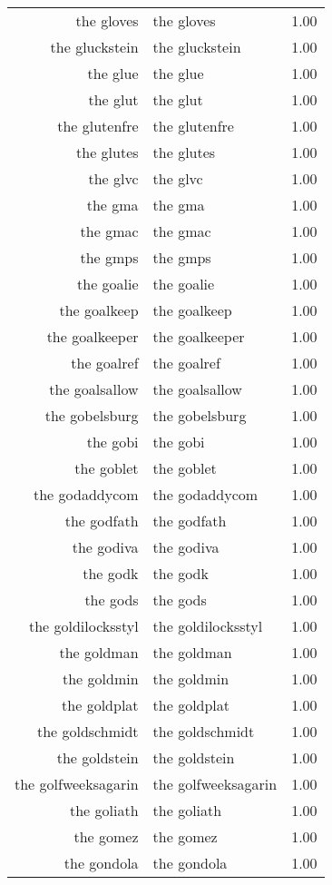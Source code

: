 \begin{table}[ht]
\begin{tabular}{rlr}
  the gloves & the gloves & 1.00 \\ 
  the gluckstein & the gluckstein & 1.00 \\ 
  the glue & the glue & 1.00 \\ 
  the glut & the glut & 1.00 \\ 
  the glutenfre & the glutenfre & 1.00 \\ 
  the glutes & the glutes & 1.00 \\ 
  the glvc & the glvc & 1.00 \\ 
  the gma & the gma & 1.00 \\ 
  the gmac & the gmac & 1.00 \\ 
  the gmps & the gmps & 1.00 \\ 
  the goalie & the goalie & 1.00 \\ 
  the goalkeep & the goalkeep & 1.00 \\ 
  the goalkeeper & the goalkeeper & 1.00 \\ 
  the goalref & the goalref & 1.00 \\ 
  the goalsallow & the goalsallow & 1.00 \\ 
  the gobelsburg & the gobelsburg & 1.00 \\ 
  the gobi & the gobi & 1.00 \\ 
  the goblet & the goblet & 1.00 \\ 
  the godaddycom & the godaddycom & 1.00 \\ 
  the godfath & the godfath & 1.00 \\ 
  the godiva & the godiva & 1.00 \\ 
  the godk & the godk & 1.00 \\ 
  the gods & the gods & 1.00 \\ 
  the goldilocksstyl & the goldilocksstyl & 1.00 \\ 
  the goldman & the goldman & 1.00 \\ 
  the goldmin & the goldmin & 1.00 \\ 
  the goldplat & the goldplat & 1.00 \\ 
  the goldschmidt & the goldschmidt & 1.00 \\ 
  the goldstein & the goldstein & 1.00 \\ 
  the golfweeksagarin & the golfweeksagarin & 1.00 \\ 
  the goliath & the goliath & 1.00 \\ 
  the gomez & the gomez & 1.00 \\ 
  the gondola & the gondola & 1.00 \\ 

\end{tabular}
\end{table}
